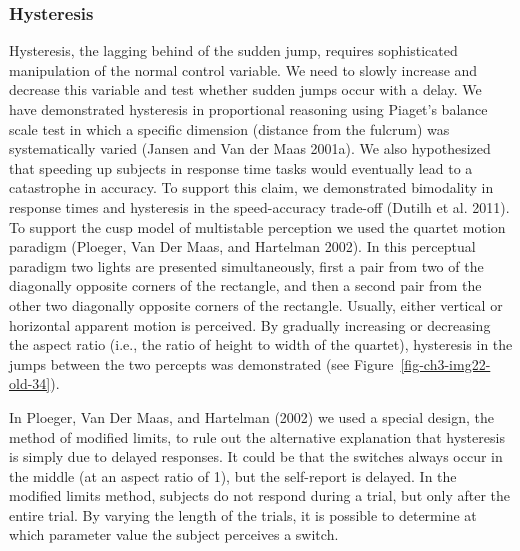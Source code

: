 \documentclass[
  a4paper,
  DIV=11,
  numbers=noendperiod,
  oneside]{scrreprt}
\begin{document}
\hypertarget{sec-Hysteresis}{%
\subsubsection{Hysteresis}\label{sec-Hysteresis}}

Hysteresis, the lagging behind of the sudden jump, requires
sophisticated manipulation of the normal control variable. We need to
slowly increase and decrease this variable and test whether sudden jumps
occur with a delay. We have demonstrated hysteresis in proportional
reasoning using Piaget's balance scale test in which a specific
dimension (distance from the fulcrum) was systematically varied (Jansen
and Van der Maas 2001a). We also hypothesized that speeding up subjects
in response time tasks would eventually lead to a catastrophe in
accuracy. To support this claim, we demonstrated bimodality in response
times and hysteresis in the speed-accuracy trade-off (Dutilh et al.
2011). To support the cusp model of multistable perception we used the
quartet motion paradigm (Ploeger, Van Der Maas, and Hartelman 2002). In
this perceptual paradigm two lights are presented simultaneously, first
a pair from two of the diagonally opposite corners of the rectangle, and
then a second pair from the other two diagonally opposite corners of the
rectangle. Usually, either vertical or horizontal apparent motion is
perceived. By gradually increasing or decreasing the aspect ratio (i.e.,
the ratio of height to width of the quartet), hysteresis in the jumps
between the two percepts was demonstrated (see
Figure~\ref{fig-ch3-img22-old-34}).

In Ploeger, Van Der Maas, and Hartelman (2002) we used a special design,
the method of modified limits, to rule out the alternative explanation
that hysteresis is simply due to delayed responses. It could be that the
switches always occur in the middle (at an aspect ratio of 1), but the
self-report is delayed. In the modified limits method, subjects do not
respond during a trial, but only after the entire trial. By varying the
length of the trials, it is possible to determine at which parameter
value the subject perceives a switch.
\end{document}
